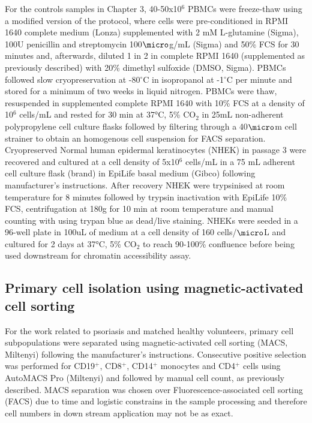 For the controls samples in Chapter 3, 40-50x10$^6$ PBMCs were freeze-thaw using a modified version of the \parencite{Kent2009} protocol, where cells were pre-conditioned in RPMI 1640 complete medium (Lonza) supplemented with 2 mM L-glutamine (Sigma), 100U penicillin and streptomycin 100$\micro$g/mL (Sigma) and 50\% FCS for 30 minutes and, afterwards, diluted 1 in 2 in complete RPMI 1640 (supplemented as previously described) with 20\% dimethyl sulfoxide (DMSO, Sigma). PBMCs followed slow cryopreservation at -80{$^\circ$}C in isopropanol at -1{$^\circ$}C per minute and stored for a minimum of two weeks in liquid nitrogen. PBMCs were thaw, resuspended in supplemented complete RPMI 1640 with 10\% FCS at a density of 10$^6$ cells/mL and rested for 30 min at 37°C, 5\% CO$_2$ in 25mL non-adherent polypropylene cell culture flasks followed by filtering through a 40$\micro$m cell strainer to obtain an homogenous cell suspension for FACS separation.
%
Cryopreserved Normal human epidermal keratinocytes (NHEK) in passage 3 were recovered and cultured at a cell density of 5x10$^6$ cells/mL in a 75 mL adherent cell culture flask (brand) in EpiLife basal medium (Gibco) following manufacturer's instructions. After recovery NHEK were trypsinised at room temperature for 8 minutes followed by trypsin inactivation with EpiLife 10\% FCS, centrifugation at 180g for 10 min at room temperature and manual counting with using trypan blue as dead/live staining. NHEKs were seeded in a 96-well plate in 100uL of medium at a cell density of 160 cells/$\micro$L and cultured for 2 days at 37°C, 5\% CO$_2$ to reach 90-100\% confluence before being used downstream for chromatin accessibility assay.

\subsection{Primary cell isolation using magnetic-activated cell sorting}
For the work related to psoriasis and matched healthy volunteers, primary cell subpopulations were separated using magnetic-activated cell sorting (MACS, Miltenyi) following the manufacturer's instructions. Consecutive positive selection was performed for CD19$^+$, CD8$^+$, CD14$^+$  monocytes and CD4$^+$ cells using AutoMACS Pro (Miltenyi) and followed by manual cell count, as previously described. MACS separation was chosen over Fluorescence-associated cell sorting (FACS) due to time and logistic constrains in the sample processing and therefore cell numbers in down stream application may not be as exact.

